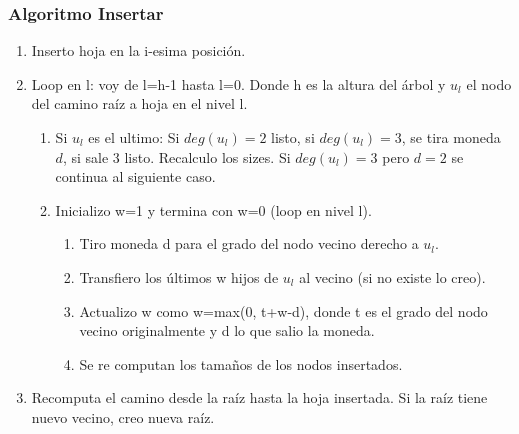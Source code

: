 \documentclass[10pt,handout]{beamer}
\begin{document}
\begin{frame}
\frametitle{Algoritmo Insertar}
 \begin{enumerate}\itemsep-1em
  \item Inserto hoja en la i-esima posición.
  \item Loop en l: voy de l=h-1 hasta l=0.
    Donde h es la altura del árbol y $u_l$ el nodo del camino raíz a hoja en el nivel l.
\pause
    \vspace{-0.4cm}
    \begin{enumerate}[a]\itemsep-1em
    \item Si $u_l$ es el ultimo: Si $deg(u_l)=2$ listo, si $deg(u_l)=3$, se tira moneda $d$, si sale 3 listo. Recalculo los sizes.
      Si $deg(u_l)=3$ pero $d=2$ se continua al siguiente caso.
\pause
    \item Inicializo w=1 y termina con w=0 (loop en nivel l).
          \vspace{-0.4cm}
      \begin{enumerate}[i]\itemsep-1em
\pause
        \item Tiro moneda d para el grado del nodo vecino derecho a $u_l$.
        \item Transfiero los últimos w hijos de $u_l$ al vecino (si no existe lo creo).
\pause
        \item Actualizo w como w=max(0, t+w-d), donde t es el grado del nodo vecino originalmente y d lo que salio la moneda.
         \item Se re computan los tama\~nos de los nodos insertados.
      \end{enumerate}
  \end{enumerate}
\pause
  \item  Recomputa el camino desde la raíz hasta la hoja insertada.
  Si la raíz tiene nuevo vecino, creo nueva raíz.
\end{enumerate}

\end{frame}

\end{document}
